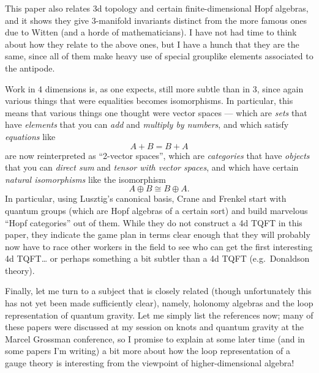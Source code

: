 \documentclass[12pt]{article}
\def\tightlist{}
\renewcommand{\texttt}[1]{%
  \begingroup
  \ttfamily
  \begingroup\lccode`~=`/\lowercase{\endgroup\def~}{/\discretionary{}{}{}}%
  \begingroup\lccode`~=`[\lowercase{\endgroup\def~}{[\discretionary{}{}{}}%
  \begingroup\lccode`~=`.\lowercase{\endgroup\def~}{.\discretionary{}{}{}}%
  \catcode`/=\active\catcode`[=\active\catcode`.=\active
  \scantokens{#1\noexpand}%
  \endgroup
}
\begin{document}
\noindent
This paper also relates 3d topology and certain finite-dimensional
Hopf algebras, and it shows they give 3-manifold invariants distinct
from the more famous ones due to Witten (and a horde of mathematicians).
I have not had time to think about how they relate to the above ones,
but I have a hunch that they are the same, since all of them make heavy
use of special grouplike elements associated to the antipode.

\noindent
Work in 4 dimensions is, as one expects, still more subtle than in 3,
since again various things that were equalities becomes isomorphisms. In
particular, this means that various things one thought were vector
spaces --- which are \emph{sets} that have \emph{elements} that you can
\emph{add} and \emph{multiply by numbers}, and which satisfy
\emph{equations} like \[A + B = B + A\] are now reinterpreted as
``2-vector spaces'', which are \emph{categories} that have
\emph{objects} that you can \emph{direct sum} and \emph{tensor with
vector spaces}, and which have certain \emph{natural isomorphisms} like
the isomorphism \[A \oplus B \cong B \oplus A.\] In particular, using
Lusztig's canonical basis, Crane and Frenkel start with quantum groups
(which are Hopf algebras of a certain sort) and build marvelous ``Hopf
categories'' out of them. While they do not construct a 4d TQFT in this
paper, they indicate the game plan in terms clear enough that they will
probably now have to race other workers in the field to see who can get
the first interesting 4d TQFT\ldots{} or perhaps something a bit subtler
than a 4d TQFT (e.g.~Donaldson theory).

Finally, let me turn to a subject that is closely related (though
unfortunately this has not yet been made sufficiently clear), namely,
holonomy algebras and the loop representation of quantum gravity. Let me
simply list the references now; many of these papers were discussed at
my session on knots and quantum gravity at the Marcel Grossman
conference, so I promise to explain at some later time (and in some
papers I'm writing) a bit more about how the loop representation of a
gauge theory is interesting from the viewpoint of higher-dimensional
algebra!
\end{document}
